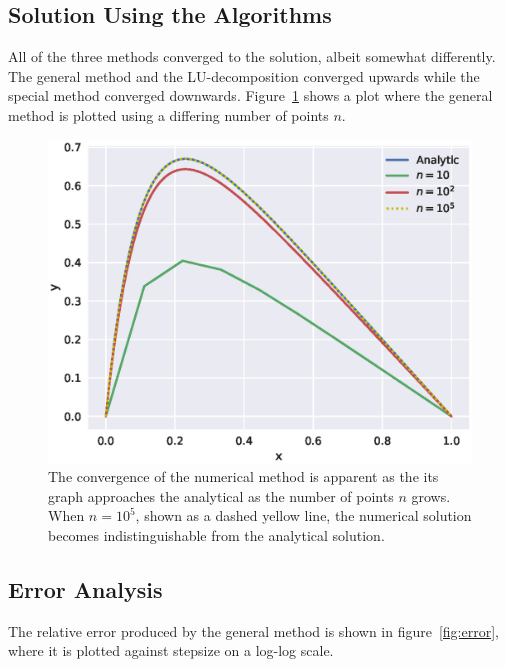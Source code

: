 \documentclass[aps,prl,reprint,toc]{revtex4-1}
\begin{document}
\subsection{Solution Using the Algorithms}

All of the three methods converged to the solution, albeit somewhat differently.
The general method and the LU-decomposition converged upwards while the
special method converged downwards. Figure~\ref{fig:general} shows a plot where
the general method is plotted using a differing number of points \(n\).

\begin{figure}[ht]
  \centering
  \includegraphics[width=\columnwidth]{figures/function.eps}
  \caption{\label{fig:general} The convergence of the numerical method is
    apparent as the its graph approaches the analytical as the number of points \(n\) grows. When \(n
    = 10^{5}\), shown as a dashed yellow line, the numerical solution becomes
    indistinguishable from the analytical solution.}
\end{figure}

\subsection{Error Analysis}

The relative error produced by the general method is shown in
figure~\ref{fig:error}, where it is plotted against stepsize on a log-log scale.
\end{document}
